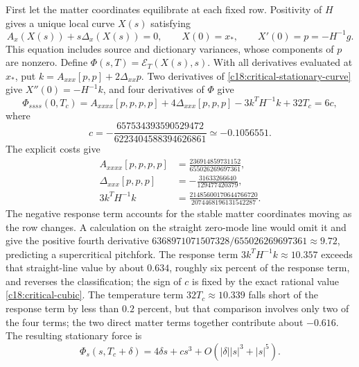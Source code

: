 First let the matter coordinates equilibrate at each fixed row. Positivity of $H$ gives a unique local curve $X(s)$ satisfying
\begin{equation}
 A_x(X(s))+s\Delta_x(X(s))=0,\qquad X(0)=x_*,\qquad X'(0)=p=-H^{-1}g.
 \label{c18:critical-stationary-curve}
\end{equation}
This equation includes source and dictionary variances, whose components of $p$ are nonzero. Define $\Phi(s,T)=\mathcal E_T(X(s),s)$. With all derivatives evaluated at $x_*$, put $k=A_{xxx}[p,p]+2\Delta_{xx}p$. Two derivatives of \cref{c18:critical-stationary-curve} give $X''(0)=-H^{-1}k$, and four derivatives of $\Phi$ give
\begin{equation}
 \Phi_{ssss}(0,T_c)=A_{xxxx}[p,p,p,p]+4\Delta_{xxx}[p,p,p]
                    -3k^TH^{-1}k+32T_c=6c,
 \label{c18:critical-quartic}
\end{equation}
where
\begin{equation}
 c=-\frac{657534393590529472}{6223404588394626861}\simeq-0.1056551.
 \label{c18:critical-cubic}
\end{equation}
The explicit costs give
\begin{equation}
 \begin{aligned}
 A_{xxxx}[p,p,p,p]&=\frac{236914859731152}{655026269697361},\\
 \Delta_{xxx}[p,p,p]&=-\frac{31633266640}{129477420379},\\
 3k^TH^{-1}k&=\frac{21485600170644766720}{2074468196131542287}.
 \end{aligned}
 \label{c18:critical-contractions}
\end{equation}
The negative response term accounts for the stable matter coordinates moving as the row changes. A calculation on the straight zero-mode line would omit it and give the positive fourth derivative $6368971071507328/655026269697361\approx9.72$, predicting a supercritical pitchfork. The response term $3k^TH^{-1}k\approx10.357$ exceeds that straight-line value by about $0.634$, roughly six percent of the response term, and reverses the classification; the sign of $c$ is fixed by the exact rational value \cref{c18:critical-cubic}. The temperature term $32T_c\approx10.339$ falls short of the response term by less than $0.2$ percent, but that comparison involves only two of the four terms; the two direct matter terms together contribute about $-0.616$. The resulting stationary force is
\begin{equation}
 \Phi_s(s,T_c+\delta)=4\delta s+c s^3+O(|\delta||s|^3+|s|^5).
 \label{c18:critical-force}
\end{equation}
